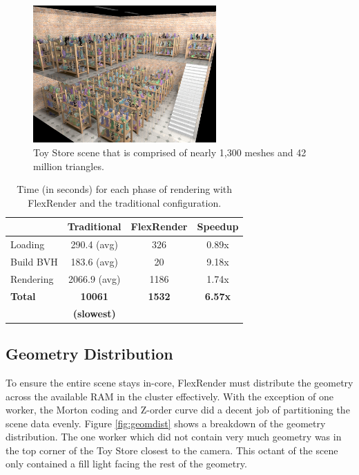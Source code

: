 \documentclass[a4paper,twoside]{article}
\begin{document}
\begin{figure}[h!]
    \centering
    \includegraphics[width=70mm]{showoff/toystore.png}
    \caption{Toy Store scene that is comprised of nearly 1,300 meshes and 42 million triangles.}
    \label{fig:sotoystore}
\end{figure}

\begin{table}
\begin{center}
\begin{tabular}{|l||c|c|c|}
    \hline
    & Traditional & FlexRender & Speedup \\
    \hline
    \hline
    Loading & 290.4 (avg) & 326 & 0.89x \\
    \hline
    Build BVH & 183.6 (avg) & 20 & 9.18x \\
    \hline
    Rendering & 2066.9 (avg) & 1186 & 1.74x \\
    \hline
    \hline
    \textbf{Total} & \textbf{10061} & \textbf{1532} & \textbf{6.57x} \\
    & \textbf{(slowest)} & & \\
    \hline
\end{tabular}
\caption{Time (in seconds) for each phase of rendering with FlexRender and the traditional configuration.}
\label{tb:flexrendertimes}
\end{center}
\end{table}

\subsection{Geometry Distribution}
\label{geomdist}

To ensure the entire scene stays in-core, FlexRender must distribute the
geometry across the available RAM in the cluster effectively. With the exception
of one worker, the Morton coding and Z-order curve did a decent job of
partitioning the scene data evenly. Figure \ref{fig:geomdist} shows a breakdown
of the geometry distribution. The one worker which did not contain very much
geometry was in the top corner of the Toy Store closest to the camera. This
octant of the scene only contained a fill light facing the rest of the geometry.
\end{document}
